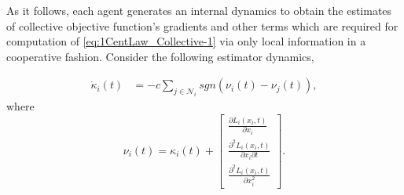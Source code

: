 \documentclass[letterpaper, 10 pt, conference]{ieeeconf}  %
\newcommand{\crb}{\color{black}}
\begin{document}
{As it follows, each agent generates an internal dynamics to obtain
the estimates of collective objective function's gradients and other
terms which are required for computation of \eqref{eq:1CentLaw_Collective-1}
via only local information in a cooperative fashion. {\crb Consider}  the following
estimator dynamics,

\begin{align}
\dot{\kappa}_{i}(t) & =-c\sum_{j\in\mathcal{{N}}_{i}}sgn\left(\nu{}_{i}(t)-\nu_{j}(t)\right),\label{eq:1EstDynamics1}
\end{align}
where
\begin{equation}
\nu_{i}(t)=\kappa_{i}(t)+\left[{\displaystyle \begin{array}{c}
	\frac{\partial L_{i}(x_{i},t)}{\partial x_{i}}\\
	\frac{\partial^{2}L_{i}(x_{i},t)}{\partial x_{i}\partial t}\\
	\frac{\partial^{2}L_{i}(x_{i},t)}{\partial x_{i}^{2}}
	\end{array}}\right].\label{eq:1IntSignal1}
\end{equation}


}
\end{document}

